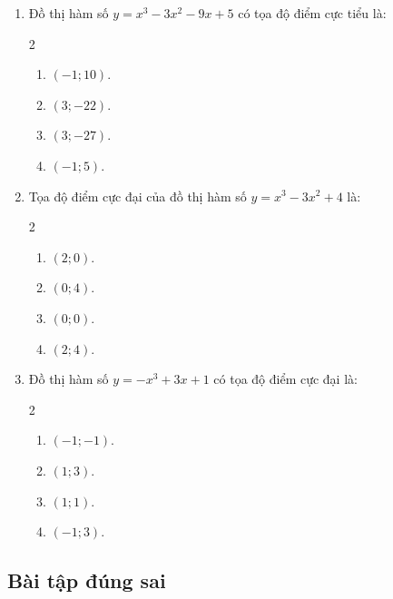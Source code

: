 \documentclass[12pt]{article}
\begin{document}
\begin{enumerate}[label=\textbf{Câu \arabic*.}]
		\item Đồ thị hàm số $y = x^3 - 3x^2 - 9x + 5$ có tọa độ điểm cực tiểu là:
		\begin{multicols}{2}
			\begin{enumerate}[label=\textbf{\Alph*.}]
				\item $(-1; 10)$.
				\item $(3; -22)$.
				\item $(3; -27)$.
				\item $(-1; 5)$.
			\end{enumerate}
		\end{multicols}
		
		\item Tọa độ điểm cực đại của đồ thị hàm số $y = x^3 - 3x^2 + 4$ là:
		\begin{multicols}{2}
			\begin{enumerate}[label=\textbf{\Alph*.}]
				\item $(2; 0)$.
				\item $(0; 4)$.
				\item $(0; 0)$.
				\item $(2; 4)$.
			\end{enumerate}
		\end{multicols}
		
		\item Đồ thị hàm số $y = -x^3 + 3x + 1$ có tọa độ điểm cực đại là:
		\begin{multicols}{2}
			\begin{enumerate}[label=\textbf{\Alph*.}]
				\item $(-1; -1)$.
				\item $(1; 3)$.
				\item $(1; 1)$.
				\item $(-1; 3)$.
			\end{enumerate}
		\end{multicols}
		
	\end{enumerate}
	
	
	\subsection{Bài tập đúng sai}
	
\end{document}
